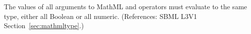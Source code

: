 \removedRule
  {The values of all arguments to MathML  and  operators
must evaluate to the same type, either all Boolean or all numeric.}
  {(References: SBML L3V1 Section~\ref{sec:mathmltype}.)}
  

